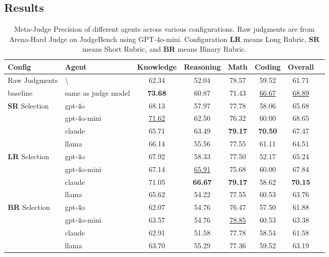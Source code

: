 \documentclass{article}
\theoremstyle{plain}
\theoremstyle{definition}
\theoremstyle{remark}
\begin{document}
\subsection{Results}
\begin{table}[ht]
\centering
\begin{tabular}{llcccccc}
\toprule
\textbf{Config} &\textbf{Agent} & \textbf{Knowledge} & \textbf{Reasoning} & \textbf{Math} & \textbf{Coding} & \textbf{Overall} \\
\midrule
Raw Judgments & \textbackslash & 62.34 & 52.04 & 78.57 & 59.52 & 61.71 \\
baseline & same as judge model&\textbf{73.68} &60.87 & 71.43& \underline{66.67}&  \underline{68.89}\\
\midrule
\textbf{SR} Selection&gpt-4o & 68.13 & 57.97 & 77.78 & 58.06 & 65.68\\
&gpt-4o-mini & \underline{71.62} & 62.50 & 76.32 & 60.00 & {68.65} \\
&claude & 65.71 & 63.49 & \textbf{79.17} & \textbf{70.50} & 67.47 \\
&llama & 66.14& 55.56 & 77.55 & 61.11 & 64.51 \\

\midrule
\textbf{LR} Selection&gpt-4o & 67.92& 58.33& 77.50& 52.17&65.24 \\
&gpt-4o-mini & 67.14 & \underline{65.91} & 75.68 & 60.00 & 67.84\\
&claude & {71.05} & \textbf{66.67} & \textbf{79.17} & 58.62 & \textbf{70.15} \\
&llama & 65.62& 54.22& 77.55& 60.53& 63.76 \\

\midrule
\textbf{BR} Selection&gpt-4o & 62.07& 54.76& {76.47}& {57.50}&61.88 \\
&gpt-4o-mini & 63.57& 54.76 & \underline{78.85}& 60.53& 63.38\\
&claude& 62.91& 51.58& 77.78& 58.54& 61.58 \\
&llama &63.70 &55.29 & 77.36 & 59.52 & 63.19 \\
\bottomrule
\end{tabular}
\caption{Meta-Judge Precision of different agents across various configurations. Raw judgments are from Arena-Hard Judge on JudgeBench using GPT-4o-mini. Configuration \textbf{LR} means Long Rubric, \textbf{SR} means Short Rubric, and \textbf{BR} means Binary Rubric.}
\label{tb:single-meta-judge-1}
\end{table}
\end{document}

